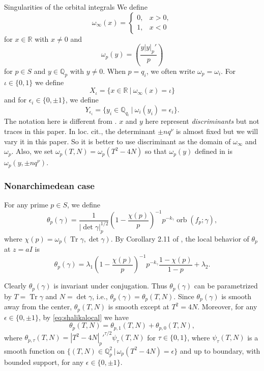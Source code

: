 \documentclass[10pt,oneside,reqno]{amsart}
\makeatletter
\newcommand\QQ{\mathbb{Q}}
\newcommand\RR{\mathbb{R}}
\DeclareMathOperator\Tr{Tr}
\DeclareMathOperator\orb{orb}
\newcommand\legendresymbol[2]{\genfrac{(}{)}{}{}{#1}{#2}}
\def\subsection{\@startsection{subsection}{2}%
  \z@{3pt\@plus0pt}{-.5em}%
  {\normalfont\bfseries}}
\theoremstyle{THEOREM}
\theoremstyle{DEFINITION}
\theoremstyle{EXERCISE}
\numberwithin{equation}{section}
\makeatother
\begin{document}
\subsection{Singularities of the orbital integrals}\label{subsec:singularities}
We define
\[
\omega_\infty(x)=\begin{cases}
             0, & x>0, \\
             1, & x<0
           \end{cases}
\]
for $x\in \RR$ with $x\neq 0$ and
\[
\omega_p(y)=\legendresymbol{y|y|_{p}'}{p}
\]
for $p\in S$ and $y\in \QQ_p$ with $y\neq 0$. When $p=q_i$, we often write $\omega_p=\omega_i$.
For $\iota\in \{0,1\}$ we define
\[
X_{\iota}=\{x\in \RR\ |\ \omega_\infty(x)=\iota\}
\]
and for $\epsilon_i\in \{0,\pm 1\}$, we define
\[
Y_{\epsilon_i}=\{y_i\in \QQ_{q_i}\ |\ \omega_i(y_i)=\epsilon_i\}. 
\]
The notation here is different from \cite{cheng2025b}. $x$ and $y$ here represent \emph{discriminants} but not traces in this paper. In loc. cit., the determinant $\pm nq^\nu$ is almost fixed but we will vary it in this paper. So it is better to use discriminant as the domain of $\omega_\infty$ and $\omega_p$. Also, we set $\omega_p(T,N)=\omega_p(T^2-4N)$ so that $\omega_p(y)$ defined in \cite{cheng2025b} is $\omega_p(y,\pm nq^\nu)$.

\subsubsection{Nonarchimedean case}
For any prime $p\in S$, we define
\[
\theta_{p}(\gamma)=\frac{1}{\mathopen{|}\det\gamma\mathclose{|}_p^{1/2}}\left(1-\frac{\chi(p)}{p}\right)^{-1}p^{-{k_\gamma}}\orb(f_{p};\gamma),
\]
where $\chi(p)=\omega_p(\Tr\gamma,\det\gamma)$. By Corollary 2.11 of \cite{cheng2025}, the local behavior of $\theta_{p}$ at $z=aI$ is
\begin{equation}\label{eq:shalikalocal}
\theta_{p}(\gamma)=\lambda_1\left(1-\frac{\chi(p)}{p}\right)^{-1}p^{-{k_\gamma}} \frac{1-\chi(p)}{1-p}+\lambda_2.
\end{equation}

Clearly $\theta_{p}(\gamma)$ is invariant under conjugation. Thus $\theta_{p}(\gamma)$ can be parametrized by $T=\Tr\gamma$ and $N=\det\gamma$, i.e., $\theta_{p}(\gamma)=\theta_p(T,N)$. 
Since $\theta_p(\gamma)$ is smooth away from the center, $\theta_p(T,N)$ is smooth except at $T^2=4N$. Moreover, for any $\epsilon\in \{0,\pm 1\}$, by \eqref{eq:shalikalocal} we have
\[
\theta_p(T,N)=\theta_{p,1}(T,N)+\theta_{p,0}(T,N),
\]
where $\theta_{p,\tau}(T,N)={|T^2-4N|_p'}^{\tau/2}\psi_\tau(T,N)$ for $\tau\in \{0,1\}$, where $\psi_\tau(T,N)$ is a smooth function on $\{(T,N)\in \QQ_p^2\,|\,\omega_p(T^2-4N)=\epsilon\}$ and up to boundary, with bounded support, for any $\epsilon\in \{0,\pm 1\}$.
\end{document}
